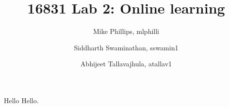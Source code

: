 \documentclass[a4paper]{article}
\title{16831 Lab 2: Online learning}
\author{Mike Phillips, mlphilli \and Siddharth Swaminathan, sswamin1 \and Abhijeet
  Tallavajhula, atallav1}
\begin{document}
\maketitle

Hello Hello.

\begin{thebibliography}{10}
\end{thebibliography}
\end{document}
